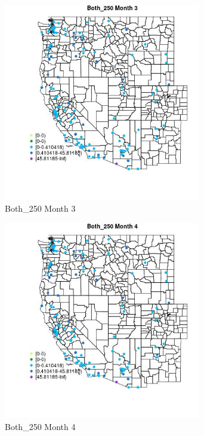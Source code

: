 \begin{figure} 
\centering  
\includegraphics[width=0.77\textwidth]{Code_Outputs/Report_ML_input_PM25_Step4_part_e_de_duplicated_aves_MapObsMo3Both_250.jpg} 
\caption{\label{fig:Report_ML_input_PM25_Step4_part_e_de_duplicated_avesMapObsMo3Both_250}Both_250 Month 3} 
\end{figure} 
 

\begin{figure} 
\centering  
\includegraphics[width=0.77\textwidth]{Code_Outputs/Report_ML_input_PM25_Step4_part_e_de_duplicated_aves_MapObsMo4Both_250.jpg} 
\caption{\label{fig:Report_ML_input_PM25_Step4_part_e_de_duplicated_avesMapObsMo4Both_250}Both_250 Month 4} 
\end{figure} 
 

